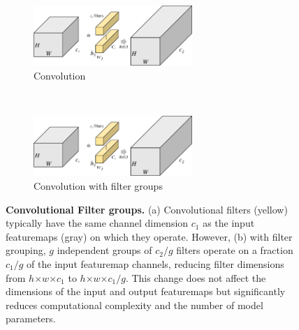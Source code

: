 \documentclass[thesis]{subfiles}
\begin{document}
	\begin{figure}[tbp]
		\begin{subfigure}[b]{0.95\textwidth}
			\centering
			\includegraphics[width=0.66\textwidth, page=1]{Figs/PDF/groupfig}
			\caption{Convolution}\label{fig:normalconv}
		\end{subfigure}
		~
		\begin{subfigure}[b]{0.95\textwidth}
			\centering
			\includegraphics[width=0.66\textwidth, page=2]{Figs/PDF/groupfig}
			\caption{Convolution with filter groups}\label{fig:groupedconv}
		\end{subfigure}
		\caption[Convolutional filter groups]{\textbf{Convolutional Filter groups.} (a) Convolutional filters (yellow) typically have the same channel dimension $c_1$ as the input \glspl{featuremap} (gray) on which they operate. However, (b) with filter grouping, $g$ independent groups of $c_2/g$ filters operate on a fraction $c_1/g$ of the input \gls{featuremap} channels, reducing filter dimensions from $h$$\times$$w$$\times$$c_1$ to $h$$\times$$w$$\times$$c_1/g$. This change does not affect the dimensions of the input and output \glspl{featuremap} but significantly reduces computational complexity and the number of model parameters.}\label{fig:groupconfig}
	\end{figure}
\end{document}
